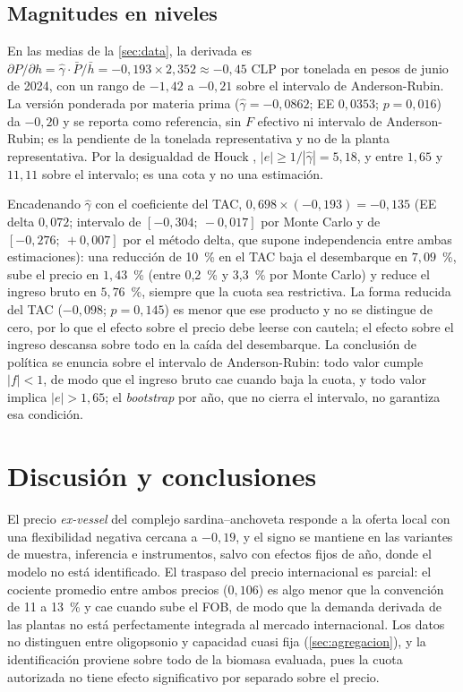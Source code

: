 \documentclass[11pt]{article}
\begin{document}
\subsection{Magnitudes en niveles}\label{sec:niveles}

En las medias de la \autoref{sec:data}, la derivada es $\partial P/\partial h=\hat\gamma\cdot\bar P/\bar h=-0{,}193\times2{,}352\approx-0{,}45$ CLP por tonelada en pesos de junio de 2024, con un rango de $-1{,}42$ a $-0{,}21$ sobre el intervalo de Anderson-Rubin. La versión ponderada por materia prima ($\hat\gamma=-0{,}0862$; EE $0{,}0353$; $p=0{,}016$) da $-0{,}20$ y se reporta como referencia, sin $F$ efectivo ni intervalo de Anderson-Rubin; es la pendiente de la tonelada representativa y no de la planta representativa. Por la desigualdad de Houck \parencite{houck1965}, $|e|\geq1/|\hat\gamma|=5{,}18$, y entre $1{,}65$ y $11{,}11$ sobre el intervalo; es una cota y no una estimación.

Encadenando $\hat\gamma$ con el coeficiente del TAC, $0{,}698\times(-0{,}193)=-0{,}135$ (EE delta $0{,}072$; intervalo de $[-0{,}304;\ -0{,}017]$ por Monte Carlo y de $[-0{,}276;\ +0{,}007]$ por el método delta, que supone independencia entre ambas estimaciones): una reducción de 10~\% en el TAC baja el desembarque en $7{,}09$~\%, sube el precio en $1{,}43$~\% (entre 0,2~\% y 3,3~\% por Monte Carlo) y reduce el ingreso bruto en $5{,}76$~\%, siempre que la cuota sea restrictiva. La forma reducida del TAC ($-0{,}098$; $p=0{,}145$) es menor que ese producto y no se distingue de cero, por lo que el efecto sobre el precio debe leerse con cautela; el efecto sobre el ingreso descansa sobre todo en la caída del desembarque. La conclusión de política se enuncia sobre el intervalo de Anderson-Rubin: todo valor cumple $|f|<1$, de modo que el ingreso bruto cae cuando baja la cuota, y todo valor implica $|e|>1{,}65$; el \textit{bootstrap} por año, que no cierra el intervalo, no garantiza esa condición.

\section{Discusión y conclusiones}\label{sec:discusion}

El precio \textit{ex-vessel} del complejo sardina--anchoveta responde a la oferta local con una flexibilidad negativa cercana a $-0{,}19$, y el signo se mantiene en las variantes de muestra, inferencia e instrumentos, salvo con efectos fijos de año, donde el modelo no está identificado. El traspaso del precio internacional es parcial: el cociente promedio entre ambos precios ($0{,}106$) es algo menor que la convención de 11 a 13~\% y cae cuando sube el FOB, de modo que la demanda derivada de las plantas no está perfectamente integrada al mercado internacional. Los datos no distinguen entre oligopsonio y capacidad cuasi fija (\autoref{sec:agregacion}), y la identificación proviene sobre todo de la biomasa evaluada, pues la cuota autorizada no tiene efecto significativo por separado sobre el precio.
\end{document}
